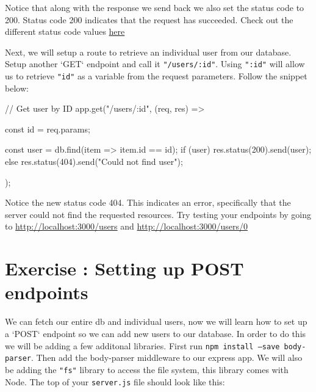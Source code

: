 \documentclass{42-en}
\begin{document}
    Notice that along with the response we send back we also set the status code to 200. Status code 200 indicates that the request has succeeded. Check out the different status code values \href{https://developer.mozilla.org/en-US/docs/Web/HTTP/Status}{here} 

    Next, we will setup a route to retrieve an individual user from our database. Setup another `GET` endpoint and call it \texttt{"/users/:id"}. Using \texttt{":id"} will allow us to retrieve \texttt{"id"} as a variable from the request parameters. Follow the snippet below:
\begin{42jscode}
// Get user by ID
app.get("/users/:id", (req, res) => {
    const { id } = req.params;

    const user = db.find(item => item.id == id);
    if (user) {
        res.status(200).send(user);
    } else {
        res.status(404).send("Could not find user");
    }
});
\end{42jscode}

    Notice the new status code 404. This indicates an error, specifically that the server could not find the requested resources. Try testing your endpoints by going to \href{http://localhost:3000/users}{http://localhost:3000/users} and \href{http://localhost:3000/users/0}{http://localhost:3000/users/0}

\newpage
\nextexercice

\chapter{Exercise \exercicenumber: Setting up POST endpoints}

    We can fetch our entire db and individual users, now we will learn how to set up a `POST` endpoint so we can add new users to our database. In order to do this we will be adding a few additonal libraries. First run \texttt{npm install --save body-parser}. Then add the body-parser middleware to our express app. We will also be adding the \texttt{"fs"} library to access the file system, this library comes with Node. The top of your \texttt{server.js} file should look like this:
\end{document}
